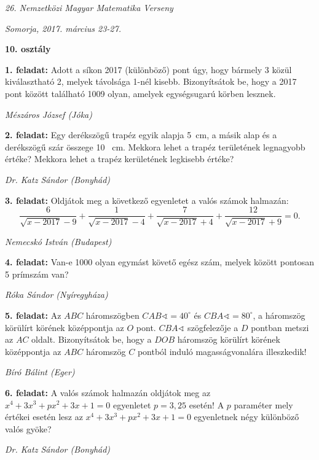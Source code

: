 \documentclass[a4paper,10pt]{article}
\newcommand{\ki}[2]{\hfill {\it #1 (#2)}\medskip}
\begin{document}
\begin{center} \Large {\em 26. Nemzetközi Magyar Matematika Verseny} \end{center}
\begin{center} \large{\em Somorja, 2017. március 23-27.} \end{center}
\smallskip
\begin{center} \large{\bf 10. osztály} \end{center}
\bigskip

{\bf 1. feladat: } Adott a síkon 2017 (különböző) pont úgy, hogy bármely 3 közül kiválasztható 2, melyek távolsága 1-nél
kisebb. Bizonyítsátok be, hogy a 2017 pont között található 1009 olyan, amelyek egységsugarú körben lesznek.

\ki{Mészáros József}{Jóka}\medskip

{\bf 2. feladat: } Egy derékszögű trapéz egyik alapja 5~cm, a másik alap és a derékszögű szár összege 10~ cm. Mekkora lehet a
trapéz területének legnagyobb értéke? Mekkora lehet a trapéz kerületének legkisebb értéke?

\ki{Dr. Katz Sándor}{Bonyhád}\medskip

{\bf 3. feladat: } Oldjátok meg a következő egyenletet a valós számok halmazán:
$$\frac{6}{\sqrt{x-2017}-9}+
\frac{1}{\sqrt{x-2017}-4}+
\frac{7}{\sqrt{x-2017}+4}+
\frac{12}{\sqrt{x-2017}+9}=0.
$$

\ki{Nemecskó István}{Budapest}\medskip

{\bf 4. feladat: } Van-e 1000 olyan egymást követő egész szám, melyek között pontosan 5 prímszám van?

\ki{Róka Sándor}{Nyíregyháza}\medskip

{\bf 5. feladat: } Az $ABC$ háromszögben
$CAB\sphericalangle=40^\circ$
és
$CBA\sphericalangle=80^\circ$, a háromszög körülírt körének középpontja az $O$ pont.
$CBA\sphericalangle$ szögfelezője a $D$
pontban metszi az $AC$
oldalt. Bizonyítsátok be, hogy a $DOB$
háromszög körülírt
körének középpontja az $ABC$
háromszög $C$ pontból induló magasságvonalára illeszkedik!

\ki{Bíró Bálint}{Eger}\medskip

{\bf 6. feladat: } A valós számok halmazán oldjátok meg az $x^4+3x^3+px^2+3x+1=0$ egyenletet
$p=3{,}25$ esetén! A $p$
paraméter mely értékei esetén lesz az
$x^4+3x^3+px^2+3x+1=0$
egyenletnek négy különböző valós gyöke?

\ki{Dr. Katz Sándor}{Bonyhád}\medskip
\end{document}

